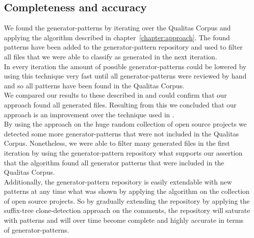 \subsection{Completeness and accuracy}
We found the generator-patterns by iterating over the Qualitas Corpus and applying the algorithm described in chapter~\ref{chapter:approach}. The found patterns have been added to the generator-pattern repository and used to filter all files that we were able to classify as generated in the next iteration.\\
In every iteration the amount of possible generator-patterns could be lowered by using this technique very fast until all generator-patterns were reviewed by hand and so all patterns have been found in the Qualitas Corpus.\\
We compared our results to these described in \cite{Bernwieser2014} and could confirm that our approach found all generated files. Resulting from this we concluded that our approach is an improvement over the technique used in \cite{Bernwieser2014}.\\
By using the approach on the huge random collection of open source projects we detected some more generator-patterns that were not included in the Qualitas Corpus. Nonetheless, we were able to filter many generated files in the first iteration by using the generator-pattern repository what supports our assertion that the algorithm found all generator patterns that were included in the Qualitas Corpus.\\
Additionally, the generator-pattern repository is easily extendable with new patterns at any time what was shown by applying the algorithm on the collection of open source projects. So by gradually extending the repository by applying the suffix-tree clone-detection approach on the comments, the repository will saturate with patterns and will over time become complete and highly accurate in terms of generator-patterns.

